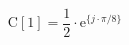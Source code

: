\begin{center}
\[
\textrm{C}[1] = \frac{1}{2} \cdot \textrm{e}^{\{ j \cdot \pi/8 \}}
\]
\end{center}
